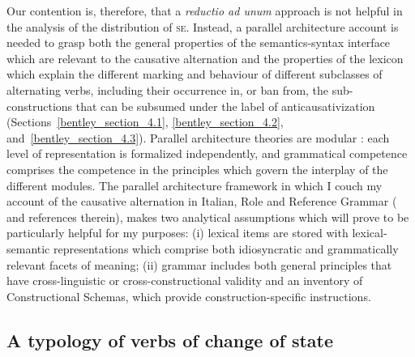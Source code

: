 \documentclass[output=paper,colorlinks,citecolor=brown
]{langscibook}
\begin{document}
Our contention is, therefore, that a \textit{reductio ad unum} approach is not helpful in the analysis of the distribution of \textsc{se}. Instead, a parallel architecture account is needed to grasp both the general properties of the semantics-syntax interface which are relevant to the causative alternation and the properties of the lexicon which explain the different marking and behaviour of different subclasses of alternating verbs, including their occurrence in, or ban from, the sub-constructions that can be subsumed under the label of anticausativization (Sections~\ref{bentley_section_4.1}, \ref{bentley_section_4.2}, and~\ref{bentley_section_4.3}). Parallel architecture theories are modular \citep{jackendoff2002foundations}: each level of representation is formalized independently, and grammatical competence comprises the competence in the principles which govern the interplay of the different modules. The parallel architecture framework in which I couch my account of the causative alternation in Italian, Role and Reference Grammar (\cite{vanvalin2023principles} and references therein), makes two analytical assumptions which will prove to be particularly helpful for my purposes: (i) lexical items are stored with lexical-semantic representations which comprise both idiosyncratic and grammatically relevant facets of meaning; (ii) grammar includes both general principles that have cross-linguistic or cross-constructional validity and an inventory of Constructional Schemas, which provide construction-specific instructions. 

\subsection{A typology of verbs of change of state}
\label{bentley_section_5.2}
\end{document}
